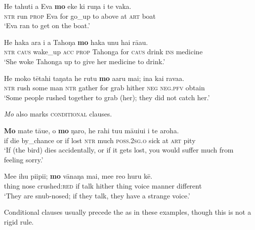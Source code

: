 \ea\label{ex:11.141}
\gll He tahuti a Eva \textbf{mo} eke ki ruŋa i te vaka. \\
\textsc{ntr} run \textsc{prop} Eva for go\_up to above at \textsc{art} boat \\

\glt 
‘Eva ran to get on the boat.’ \textstyleExampleref{[R210.060]} 
\z

\ea\label{ex:11.142}
\gll He haka {\ꞌ}ara i a Tahoŋa \textbf{mo} haka unu hai rā{\ꞌ}au. \\
\textsc{ntr} \textsc{caus} wake\_up \textsc{acc} \textsc{prop} Tahonga for \textsc{caus} drink \textsc{ins} medicine \\

\glt 
‘She woke Tahonga up to give her medicine to drink.’ \textstyleExampleref{[R301.159]} 
\z

\ea\label{ex:11.143}
\gll He moko tētahi taŋata he rutu \textbf{mo} {\ꞌ}a{\ꞌ}aru mai; {\ꞌ}ina kai rava{\ꞌ}a.\\
\textsc{ntr} rush some man \textsc{ntr} gather for grab hither \textsc{neg} \textsc{neg.pfv} obtain\\

\glt
‘Some people rushed together to grab (her); they did not catch her.’ \textstyleExampleref{[Ley-9-55.149]}
\z

\textit{Mo} also marks \textsc{conditional} clauses.

\ea\label{ex:11.144}
\gll \textbf{Mo} mate tā{\ꞌ}ue, {\ꞌ}o \textbf{mo} ŋaro, he rahi tu{\ꞌ}u māuiui {\ꞌ}i te {\ꞌ}aroha. \\
if die by\_chance or if lost \textsc{ntr} much \textsc{poss.2sg.o} sick at \textsc{art} pity \\

\glt 
‘If (the bird) dies accidentally, or if it gets lost, you would suffer much from feeling sorry.’ \textstyleExampleref{[R213.027]} 
\z

\ea\label{ex:11.145}
\gll Me{\ꞌ}e ihu pi{\ꞌ}ipi{\ꞌ}i; \textbf{mo} vānaŋa mai, me{\ꞌ}e re{\ꞌ}o huru kē. \\
thing nose crushed:\textsc{red} if talk hither thing voice manner different \\

\glt
‘They are snub-nosed; if they talk, they have a strange voice.’ \textstyleExampleref{[R310.252]} 
\z

Conditional clauses usually precede the  as in these examples, though this is not a rigid rule. 

